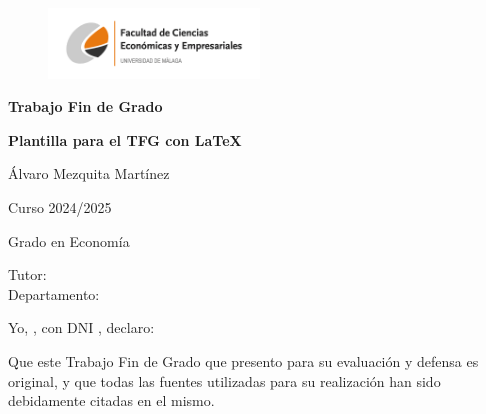 \documentclass[12pt,a4paper]{report}
\numberwithin{figure}{section} %
\numberwithin{table}{section} %
\begin{document}
\begin{titlepage}
    \centering 
    \begin{figure}[h!]
        \centering
        \includegraphics[width=0.5\textwidth]{logo.png}
    \end{figure}
    
    \vspace*{1cm} 
    \Huge
    \textbf{Trabajo Fin de Grado}
    \vspace*{1cm}
    
    \Huge
    
    \textbf{Plantilla para el TFG con \LaTeX}
    
    \vspace{0.5cm}
    \LARGE 
    Álvaro Mezquita Martínez
    \vspace{0.5cm} 

    Curso 2024/2025
        
    \vspace{0.5cm}

    Grado en Economía
    
    \vfill

    \raggedleft     
    Tutor:  \makebox[5cm]{\dotfill} %
    \\
    Departamento:  \makebox[5cm]{\dotfill} %
    
    \vspace{5cm}
\end{titlepage}


\newpage
\thispagestyle{empty} %

\vspace{12pt}

Yo, \makebox[2cm]{\dotfill}, con DNI  \makebox[2cm]{\dotfill}, declaro: 

\vspace{12pt}

Que este Trabajo Fin de Grado que presento para su evaluación y defensa es original, y que todas las fuentes utilizadas para su realización han sido debidamente citadas en el mismo. 
\end{document}
